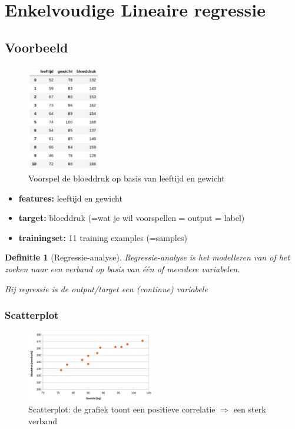 \documentclass{article}
\newtheorem{theorem}{Definitie}[section]
\begin{document}
\section{Enkelvoudige Lineaire regressie}

\subsection{Voorbeeld}

\begin{figure}[H]
    \centering
    \includegraphics[width=0.3\textwidth]{lineaire-regressie-voorbeeld.png}
    \caption{Voorspel de bloeddruk op basis van leeftijd en gewicht}
\end{figure}

\begin{itemize}
    \item \textbf{features:} leeftijd en gewicht
    \item \textbf{target:} bloeddruk (=wat je wil voorspellen = output = label)
    \item \textbf{trainingset:} 11 training examples (=samples)
\end{itemize}

\begin{theorem}[Regressie-analyse]
Regressie-analyse is het modelleren van of het zoeken naar een verband op basis van één of meerdere variabelen.

Bij regressie is de output/target een (continue) variabele
\end{theorem}

\subsubsection{Scatterplot}

\begin{figure}[H]
    \centering
    \includegraphics[width=0.5\textwidth]{lineaire-regressie-voorbeeld-scatterplot.png}
    \caption{Scatterplot: de grafiek toont een positieve correlatie $\Rightarrow$ een sterk verband}
\end{figure}
\end{document}
